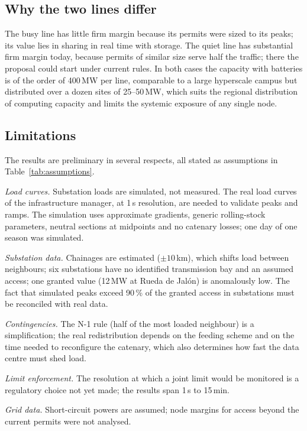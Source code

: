 \subsection{Why the two lines differ}

The busy line has little firm margin because its permits were sized to its peaks; its value lies in sharing in real time with storage. The quiet line has substantial firm margin today, because permits of similar size serve half the traffic; there the proposal could start under current rules. In both cases the capacity with batteries is of the order of 400\,MW per line, comparable to a large hyperscale campus but distributed over a dozen sites of 25--50\,MW, which suits the regional distribution of computing capacity and limits the systemic exposure of any single node.

\subsection{Limitations}

The results are preliminary in several respects, all stated as assumptions in Table~\ref{tab:assumptions}.

\emph{Load curves.} Substation loads are simulated, not measured. The real load curves of the infrastructure manager, at 1\,s resolution, are needed to validate peaks and ramps. The simulation uses approximate gradients, generic rolling-stock parameters, neutral sections at midpoints and no catenary losses; one day of one season was simulated.

\emph{Substation data.} Chainages are estimated ($\pm10$\,km), which shifts load between neighbours; six substations have no identified transmission bay and an assumed access; one granted value (12\,MW at Rueda de Jal\'on) is anomalously low. The fact that simulated peaks exceed 90\,\% of the granted access in \allTight{} substations must be reconciled with real data.

\emph{Contingencies.} The N-1 rule (half of the most loaded neighbour) is a simplification; the real redistribution depends on the feeding scheme and on the time needed to reconfigure the catenary, which also determines how fast the data centre must shed load.

\emph{Limit enforcement.} The resolution at which a joint limit would be monitored is a regulatory choice not yet made; the results span 1\,s to 15\,min.

\emph{Grid data.} Short-circuit powers are assumed; node margins for access beyond the current permits were not analysed.

